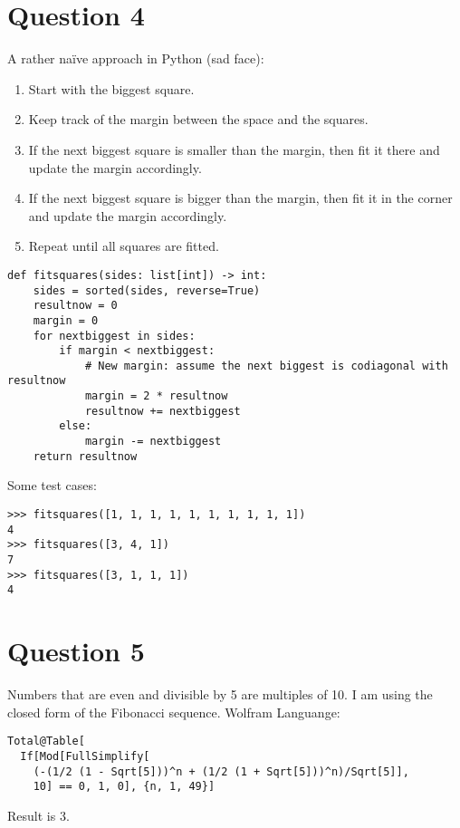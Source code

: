 \documentclass[12pt]{article}
\begin{document}
\clearpage
\section*{Question 4}
A rather na\"ive approach in Python (sad face):
\begin{enumerate}
    \item Start with the biggest square.
    \item Keep track of the margin between the space and the squares.
    \item If the next biggest square is smaller than the margin, then fit it there and update the margin accordingly.
    \item If the next biggest square is bigger than the margin, then fit it in the corner and update the margin accordingly.
    \item Repeat until all squares are fitted.
\end{enumerate}

\begin{verbatim}
def fitsquares(sides: list[int]) -> int:
    sides = sorted(sides, reverse=True)
    resultnow = 0
    margin = 0
    for nextbiggest in sides:
        if margin < nextbiggest:
            # New margin: assume the next biggest is codiagonal with resultnow
            margin = 2 * resultnow
            resultnow += nextbiggest
        else:
            margin -= nextbiggest
    return resultnow
\end{verbatim}

Some test cases:
\begin{verbatim}
>>> fitsquares([1, 1, 1, 1, 1, 1, 1, 1, 1, 1])
4
>>> fitsquares([3, 4, 1])
7
>>> fitsquares([3, 1, 1, 1])
4
\end{verbatim}

\clearpage
\section*{Question 5}
Numbers that are even and divisible by 5 are multiples of 10. I am using the closed form of the Fibonacci sequence.
Wolfram Languange:
\begin{verbatim}
Total@Table[
  If[Mod[FullSimplify[
    (-(1/2 (1 - Sqrt[5]))^n + (1/2 (1 + Sqrt[5]))^n)/Sqrt[5]],
    10] == 0, 1, 0], {n, 1, 49}]
\end{verbatim}
Result is 3.
\end{document}

